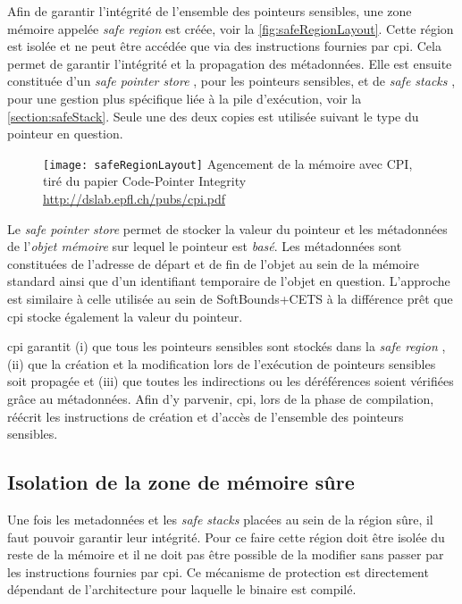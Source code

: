 Afin de garantir l'intégrité de l'ensemble des pointeurs sensibles, une zone mémoire appelée \og \textit{safe region} \fg est créée, voir la \autoref{fig:safeRegionLayout}. Cette région est isolée et ne peut être accédée que via des instructions fournies par \gls{cpi}. Cela permet de garantir l'intégrité et la propagation des métadonnées. Elle est ensuite constituée d'un \og \textit{safe pointer store} \fg, pour les pointeurs sensibles, et de \og \textit{safe stacks} \fg, pour une gestion plus spécifique liée à la pile d'exécution, voir la \autoref{section:safeStack}. Seule une des deux copies est utilisée suivant le type du pointeur en question.

\begin{figure}[H]
	\centering
	\texttt{[image: safeRegionLayout]}
	{Agencement de la mémoire avec CPI, tiré du papier Code-Pointer Integrity}
	{\url{http://dslab.epfl.ch/pubs/cpi.pdf}}
	\label{fig:safeRegionLayout}
\end{figure}

Le \textit{safe pointer store} permet de stocker la valeur du pointeur et les métadonnées de l'\textit{objet mémoire} sur lequel le pointeur est \textit{basé}. Les métadonnées sont constituées de l'adresse de départ et de fin de l'objet au sein de la mémoire standard ainsi que d'un identifiant temporaire de l'objet en question. L'approche est similaire à celle utilisée au sein de SoftBounds+CETS \cite{SoftBound} à la différence prêt que \gls{cpi} stocke également la valeur du pointeur.

\gls{cpi} garantit (i) que tous les pointeurs sensibles sont stockés dans la \og \textit{safe region} \fg, (ii) que la création et la modification lors de l'exécution de pointeurs sensibles soit propagée et (iii) que toutes les indirections ou les déréférences soient vérifiées grâce au métadonnées. Afin d'y parvenir, \gls{cpi}, lors de la phase de compilation, réécrit les instructions de création et d'accès de l'ensemble des pointeurs sensibles.


\subsection{Isolation de la zone de mémoire sûre}

Une fois les metadonnées et les \og \textit{safe stacks} \fg placées au sein de la région sûre, il faut pouvoir garantir leur intégrité. Pour ce faire cette région doit être isolée du reste de la mémoire et il ne doit pas être possible de la modifier sans passer par les instructions fournies par \gls{cpi}. Ce mécanisme de protection est directement dépendant de l'architecture pour laquelle le binaire est compilé.

